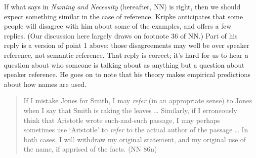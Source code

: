 If what \citeauthor{Kripke1980} says in \textit{Naming and Necessity} (hereafter, NN) is right, then we should expect something similar in the case of reference. Kripke anticipates that some people will disagree with him about some of the examples, and offers a few replies. (Our discussion here largely draws on footnote 36 of NN.)  Part of his reply is a version of point 1 above; those disagreements may well be over speaker reference, not semantic reference. That reply is correct; it's hard for us to hear a question about who someone is talking about as anything but a question about speaker reference. He goes on to note that his theory makes empirical predictions about how names are used.

\begin{quote}If I mistake Jones for Smith, I may \textit{refer} (in an appropriate sense) to Jones when I say that Smith is raking the leaves {\dots} Similarly, if I erroneously think that Aristotle wrote such-and-such passage, I may perhaps sometimes use `Aristotle' to \textit{refer} to the actual author of the passage {\dots} In both cases, I will withdraw my original statement, and my original use of the name, if apprised of the facts. (NN 86n)
\end{quote}

